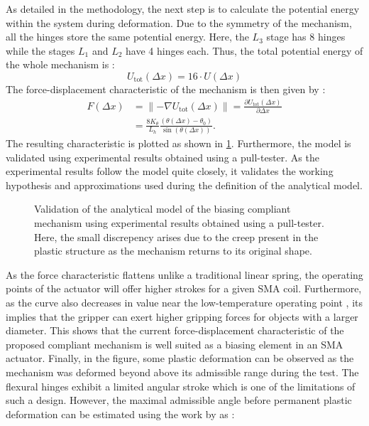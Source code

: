 As detailed in the methodology, the next step is to calculate the potential energy within the system during deformation. Due to the symmetry of the mechanism, all the hinges store the same potential energy. Here, the $L_3$ stage has 8 hinges while the stages $L_1$ and $L_2$ have 4 hinges each. Thus, the total potential energy of the whole mechanism is :
\begin{equation}\label{eq:mandrel-potential-energy-model}
U_\mathrm{tot}(\Delta x) = 16\cdot U(\Delta x)
\end{equation}
The force-displacement characteristic of the mechanism is then given by :
\begin{equation}\label{eq:mandrel-force-model}
\begin{split}
    F(\Delta x) &= \lVert -\nabla{U_\text{tot}(\Delta x)}\rVert = \frac{\partial U_\text{tot}(\Delta x)}{\partial \Delta x}\\
     &= \frac{8K_{\theta}}{L_{h}}  \frac{(\theta(\Delta x)-\theta_{0})}{\sin(\theta(\Delta x))}.
\end{split}
\end{equation}
The resulting characteristic is plotted as shown in \cref{fig:mandrel-am-expt-compare}. Furthermore, the model is validated using experimental results obtained using a pull-tester. As the experimental results follow the model quite closely, it validates the working hypothesis and approximations used during the definition of the analytical model.
\begin{figure}[hbt!] %
  \centering
  \resizebox{0.9\textwidth}{!}{}
  \caption{Validation of the analytical model of the biasing compliant mechanism using experimental results obtained using a pull-tester. Here, the small discrepency arises due to the creep present in the plastic structure as the mechanism returns to its original shape.}
  \label{fig:mandrel-am-expt-compare}
\end{figure}
As the force characteristic flattens unlike a traditional linear spring, the operating points of the actuator will offer higher strokes for a given SMA coil. Furthermore, as the curve also decreases in value near the low-temperature operating point , its implies that the gripper can exert higher gripping forces for objects with a larger diameter. This shows that the current force-displacement characteristic of the proposed compliant mechanism is well suited as a biasing element in an SMA actuator. Finally, in the figure, some plastic deformation can be observed as the mechanism was deformed beyond above its admissible range during the test. The flexural hinges exhibit a limited angular stroke which is one of the limitations of such a design. However, the maximal admissible angle before permanent plastic deformation can be estimated using the work by \cite{heneinConceptionStructuresArticulees2005} as :
